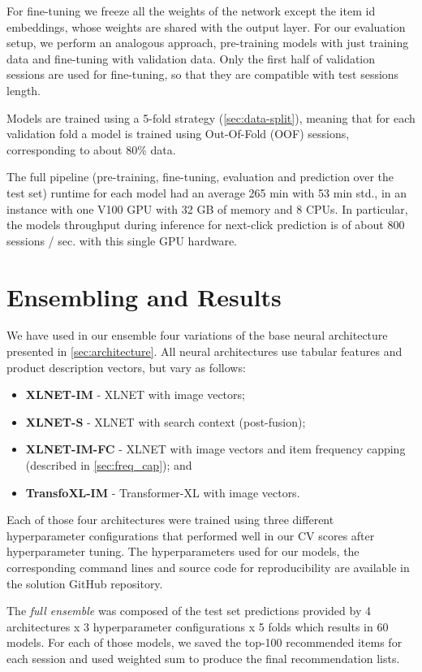\documentclass[sigconf,screen]{acmart}
\begin{document}
For fine-tuning we freeze all the weights of the network except the item id embeddings, whose weights are shared with the output layer. For our evaluation setup, we perform an analogous approach, pre-training models with just training data and fine-tuning with validation data. Only the first half of validation sessions are used for fine-tuning, so that they are compatible with test sessions length.

Models are trained using a 5-fold strategy (\cref{sec:data-split}), meaning that for each validation fold a model is trained using Out-Of-Fold (OOF) sessions, corresponding to about 80\% data. 

The full pipeline (pre-training, fine-tuning, evaluation and prediction over the test set) runtime for each model had an average 265 min with 53 min std., in an instance with one V100 GPU with 32 GB of memory and 8 CPUs. In particular, the models throughput during inference for next-click prediction is of about 800 sessions / sec. with this single GPU hardware.

\section{Ensembling and Results}
\label{sec:ensembling}

We have used in our ensemble four variations of the base neural architecture presented in \cref{sec:architecture}. All neural architectures use tabular features and  product description vectors, but vary as follows:

\begin{itemize}
    \item \textbf{XLNET-IM} - XLNET with image vectors;
    \item \textbf{XLNET-S} - XLNET with search context (post-fusion);
    \item \textbf{XLNET-IM-FC} - XLNET with image vectors and item frequency capping (described in \cref{sec:freq_cap}); and
    \item \textbf{TransfoXL-IM} - Transformer-XL with image vectors.
\end{itemize}

Each of those four architectures were trained using three different hyperparameter configurations that performed well in our CV scores after hyperparameter tuning. The hyperparameters used for our models, the corresponding command lines and source code for reproducibility are available in the solution GitHub repository. 

The \emph{full ensemble} was composed of the test set predictions provided by 4 architectures x 3 hyperparameter configurations x 5 folds which results in 60 models. For each of those models, we saved the top-100 recommended items for each session and used weighted sum to produce the final recommendation lists. 
\end{document}
